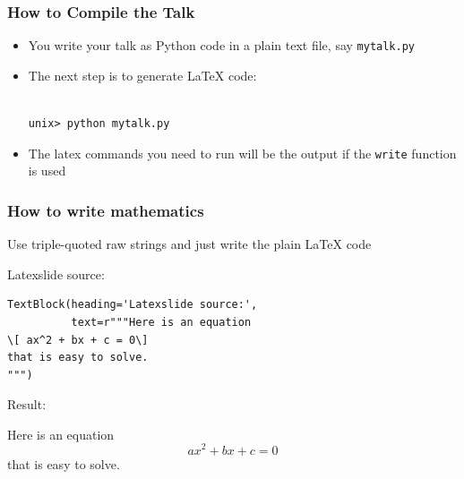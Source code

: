 \documentclass{beamer}
\newcommand{\emp}[1]{{\smaller\texttt{#1}}}
\begin{document}
\begin{frame}[fragile]
\frametitle{How to Compile the Talk}

\begin{block}

\begin{itemize}
\item You write your talk as Python code in a plain text file, say \emp{mytalk.py}
\item The next step is to generate \LaTeX{} code:\begin{Verbatim}[fontsize=\footnotesize,tabsize=4,baselinestretch=0.85,fontfamily=tt,xleftmargin=7mm]

unix> python mytalk.py
\end{Verbatim}

\item The latex commands you need to run will be the output if the \emp{write} function is used
\end{itemize}

\end{block}

\end{frame}

\begin{frame}[fragile]
\frametitle{How to write mathematics}

\begin{block}

Use triple-quoted raw strings and just write the plain \LaTeX{} code

\end{block}
\begin{block}{Latexslide source:}

\begin{Verbatim}[fontsize=\footnotesize,tabsize=4,baselinestretch=0.85,fontfamily=tt,xleftmargin=7mm]
TextBlock(heading='Latexslide source:',
          text=r"""Here is an equation
\[ ax^2 + bx + c = 0\]
that is easy to solve.
""")
\end{Verbatim}


\end{block}
\begin{block}{Result:}

Here is an equation
\[ ax^2 + bx + c = 0\]
that is easy to solve.


\end{block}

\end{frame}
\end{document}
